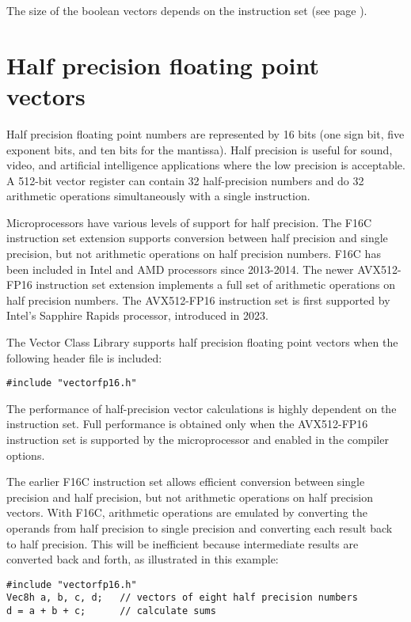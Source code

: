 \documentclass[vcl_manual.tex]{subfiles}
\begin{document}
The size of the boolean vectors depends on the instruction set (see page \pageref{tableBooleanVectorSizes}).


\section{Half precision floating point vectors} \label{HalfPrecision}
Half precision floating point numbers are represented by 16 bits (one sign bit, five exponent bits, and ten bits for the mantissa). Half precision is useful for sound, video, and artificial intelligence applications where the low precision is acceptable. A 512-bit vector register can contain 32 half-precision numbers and do 32 arithmetic operations simultaneously with a single instruction. 

Microprocessors have various levels of support for half precision. The F16C instruction set extension supports conversion between half precision and single precision, but not arithmetic operations on half precision numbers. F16C has been included in Intel and AMD processors since 2013-2014. The newer AVX512-FP16 instruction set extension implements a full set of arithmetic operations on half precision numbers. The AVX512-FP16 instruction set is first supported by Intel's Sapphire Rapids processor, introduced in 2023.

The Vector Class Library supports half precision floating point vectors when the following header file is included:
\begin{lstlisting}[frame=single]
#include "vectorfp16.h"
\end{lstlisting}

The performance of half-precision vector calculations is highly dependent on the instruction set. Full performance is obtained only when the AVX512-FP16 instruction set is supported by the microprocessor and enabled in the compiler options.

The earlier F16C instruction set allows efficient conversion between single precision and half precision, but not arithmetic operations on half precision vectors. With F16C, arithmetic operations are emulated by converting the operands from half precision to single precision and converting each result back to half precision. This will be inefficient because intermediate results are converted back and forth, as illustrated in this example:

\begin{lstlisting}[frame=single]
#include "vectorfp16.h"
Vec8h a, b, c, d;   // vectors of eight half precision numbers
d = a + b + c;      // calculate sums
\end{lstlisting}
\end{document}
